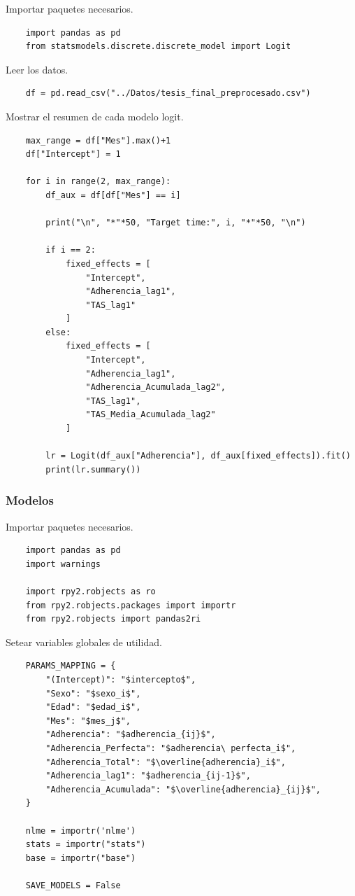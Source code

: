 \documentclass[spanish]{article}
\numberwithin{figure}{subsection}
\numberwithin{equation}{subsection}
\numberwithin{table}{subsection}
\begin{document}
Importar paquetes necesarios.

\begin{lstlisting}
	import pandas as pd
	from statsmodels.discrete.discrete_model import Logit
\end{lstlisting}

Leer los datos.

\begin{lstlisting}
	df = pd.read_csv("../Datos/tesis_final_preprocesado.csv")
\end{lstlisting}

Mostrar el resumen de cada modelo logit.

\begin{lstlisting}
	max_range = df["Mes"].max()+1
	df["Intercept"] = 1
	
	for i in range(2, max_range):
		df_aux = df[df["Mes"] == i]
	
		print("\n", "*"*50, "Target time:", i, "*"*50, "\n")
	
		if i == 2:
			fixed_effects = [
				"Intercept",
				"Adherencia_lag1",
				"TAS_lag1"
			]
		else:
			fixed_effects = [
				"Intercept",
				"Adherencia_lag1",
				"Adherencia_Acumulada_lag2",
				"TAS_lag1",
				"TAS_Media_Acumulada_lag2"
			]
	
		lr = Logit(df_aux["Adherencia"], df_aux[fixed_effects]).fit()
		print(lr.summary())
\end{lstlisting}

\subsubsection{Modelos}

Importar paquetes necesarios.

\begin{lstlisting}
	import pandas as pd
	import warnings

	import rpy2.robjects as ro
	from rpy2.robjects.packages import importr
	from rpy2.robjects import pandas2ri
\end{lstlisting}

Setear variables globales de utilidad.

\begin{lstlisting}
	PARAMS_MAPPING = {
		"(Intercept)": "$intercepto$",
		"Sexo": "$sexo_i$",
		"Edad": "$edad_i$",
		"Mes": "$mes_j$",
		"Adherencia": "$adherencia_{ij}$",
		"Adherencia_Perfecta": "$adherencia\ perfecta_i$",
		"Adherencia_Total": "$\overline{adherencia}_i$",
		"Adherencia_lag1": "$adherencia_{ij-1}$",
		"Adherencia_Acumulada": "$\overline{adherencia}_{ij}$",
	}
	
	nlme = importr('nlme')
	stats = importr("stats")
	base = importr("base")
	
	SAVE_MODELS = False
\end{lstlisting}
\end{document}
